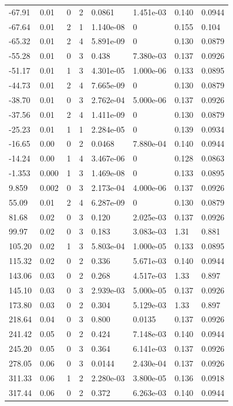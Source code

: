 \documentclass[preview]{standalone}
\begin{document}
{{\begin{tabular}{L{1.2cm}C{1.2cm} C{0.3cm}C{0.5cm} C{1.4cm}C{1.4cm} C{1.4cm}C{1.4cm}}
  -67.91  &  0.01  & 0     &  2 &  0.0861  & 1.451e-03  & 0.140 &  0.0944   \\ 
  -67.64  &  0.01  & 2     &  1 &  1.140e-08  & 0  & 0.155 &  0.104   \\ 
  -65.32  &  0.01  & 2     &  4 &  5.891e-09  & 0  & 0.130 &  0.0879   \\ 
  -55.28  &  0.01  & 0     &  3 &  0.438  & 7.380e-03  & 0.137 &  0.0926   \\ 
  -51.17  &  0.01  & 1     &  3 &  4.301e-05  & 1.000e-06  & 0.133 &  0.0895   \\ 
  -44.73  &  0.01  & 2     &  4 &  7.665e-09  & 0  & 0.130 &  0.0879   \\ 
  -38.70  &  0.01  & 0     &  3 &  2.762e-04  & 5.000e-06  & 0.137 &  0.0926   \\ 
  -37.56  &  0.01  & 2     &  4 &  1.411e-09  & 0  & 0.130 &  0.0879   \\ 
  -25.23  &  0.01  & 1     &  1 &  2.284e-05  & 0  & 0.139 &  0.0934   \\ 
  -16.65  &  0.00  & 0     &  2 &  0.0468  & 7.880e-04  & 0.140 &  0.0944   \\ 
  -14.24  &  0.00  & 1     &  4 &  3.467e-06  & 0  & 0.128 &  0.0863   \\ 
  -1.353  &  0.000  & 1     &  3 &  1.469e-08  & 0  & 0.133 &  0.0895   \\ 
  9.859  &  0.002  & 0     &  3 &  2.173e-04  & 4.000e-06  & 0.137 &  0.0926   \\ 
  55.09  &  0.01  & 2     &  4 &  6.287e-09  & 0  & 0.130 &  0.0879   \\ 
  81.68  &  0.02  & 0     &  3 &  0.120  & 2.025e-03  & 0.137 &  0.0926   \\ 
  99.97  &  0.02  & 0     &  3 &  0.183  & 3.083e-03  & 1.31 &  0.881   \\ 
  105.20  &  0.02  & 1     &  3 &  5.803e-04  & 1.000e-05  & 0.133 &  0.0895   \\ 
  115.32  &  0.02  & 0     &  2 &  0.336  & 5.671e-03  & 0.140 &  0.0944   \\ 
  143.06  &  0.03  & 0     &  2 &  0.268  & 4.517e-03  & 1.33 &  0.897   \\ 
  145.10  &  0.03  & 0     &  3 &  2.939e-03  & 5.000e-05  & 0.137 &  0.0926   \\ 
  173.80  &  0.03  & 0     &  2 &  0.304  & 5.129e-03  & 1.33 &  0.897   \\ 
  218.64  &  0.04  & 0     &  3 &  0.800  & 0.0135  & 0.137 &  0.0926   \\ 
  241.42  &  0.05  & 0     &  2 &  0.424  & 7.148e-03  & 0.140 &  0.0944   \\ 
  245.20  &  0.05  & 0     &  3 &  0.364  & 6.141e-03  & 0.137 &  0.0926   \\ 
  278.05  &  0.06  & 0     &  3 &  0.0144  & 2.430e-04  & 0.137 &  0.0926   \\ 
  311.33  &  0.06  & 1     &  2 &  2.280e-03  & 3.800e-05  & 0.136 &  0.0918   \\ 
  317.44  &  0.06  & 0     &  2 &  0.372  & 6.263e-03  & 0.140 &  0.0944   \\ 
\hline 
\end{tabular} 

}}
\end{document}
